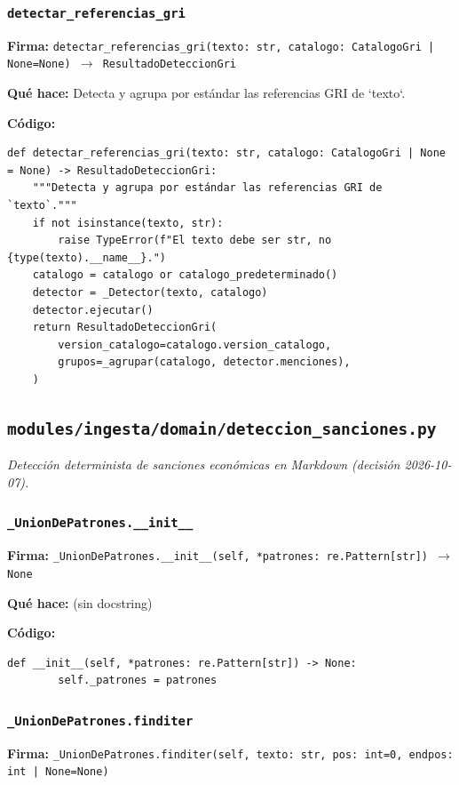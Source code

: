 \documentclass[11pt,a4paper]{article}
\begin{document}
\subsubsection*{\texttt{detectar\_referencias\_gri}}
\textbf{Firma:} \texttt{detectar\_referencias\_gri(texto: str, catalogo: CatalogoGri | None=None) $\rightarrow$ ResultadoDeteccionGri}

\textbf{Qué hace:} Detecta y agrupa por estándar las referencias GRI de `texto`.

\textbf{Código:}
\begin{lstlisting}
def detectar_referencias_gri(texto: str, catalogo: CatalogoGri | None = None) -> ResultadoDeteccionGri:
    """Detecta y agrupa por estándar las referencias GRI de `texto`."""
    if not isinstance(texto, str):
        raise TypeError(f"El texto debe ser str, no {type(texto).__name__}.")
    catalogo = catalogo or catalogo_predeterminado()
    detector = _Detector(texto, catalogo)
    detector.ejecutar()
    return ResultadoDeteccionGri(
        version_catalogo=catalogo.version_catalogo,
        grupos=_agrupar(catalogo, detector.menciones),
    )
\end{lstlisting}

\subsection{\texttt{modules/ingesta/domain/deteccion\_sanciones.py}}
\textit{Detección determinista de sanciones económicas en Markdown (decisión 2026-10-07).}

\subsubsection*{\texttt{\_UnionDePatrones.\_\_init\_\_}}
\textbf{Firma:} \texttt{\_UnionDePatrones.\_\_init\_\_(self, *patrones: re.Pattern[str]) $\rightarrow$ None}

\textbf{Qué hace:} (sin docstring)

\textbf{Código:}
\begin{lstlisting}
def __init__(self, *patrones: re.Pattern[str]) -> None:
        self._patrones = patrones
\end{lstlisting}

\subsubsection*{\texttt{\_UnionDePatrones.finditer}}
\textbf{Firma:} \texttt{\_UnionDePatrones.finditer(self, texto: str, pos: int=0, endpos: int | None=None)}
\end{document}
